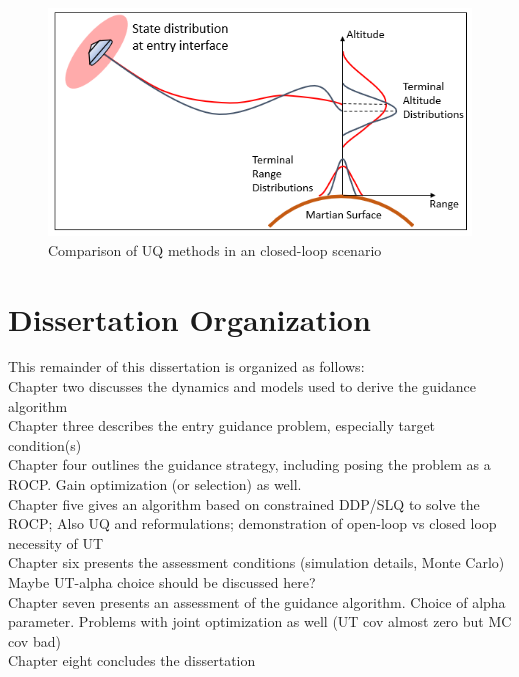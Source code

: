 \begin{figure}[h!]
	\centering
	\includegraphics[width=1\textwidth]{Images/RobustTrajectoryOptimization}
	\caption{Comparison of UQ methods in an closed-loop scenario}
	\label{Fig:RobustTrajectoryOpt}
\end{figure}

\section{Dissertation Organization}
This remainder of this dissertation is organized as follows: \\
Chapter two discusses the dynamics and models used to derive the guidance algorithm\\
Chapter three describes the entry guidance problem, especially target condition(s)\\
Chapter four outlines the guidance strategy, including posing the problem as a ROCP. Gain optimization (or selection) as well. \\
Chapter five gives an algorithm based on constrained DDP/SLQ to solve the ROCP; Also UQ and reformulations; demonstration of open-loop vs closed loop necessity of UT \\
Chapter six presents the assessment conditions (simulation details, Monte Carlo) Maybe UT-alpha choice should be discussed here?\\
Chapter seven presents an assessment of the guidance algorithm. Choice of alpha parameter. Problems with joint optimization as well (UT cov almost zero but MC cov bad) \\
Chapter eight concludes the dissertation \\


